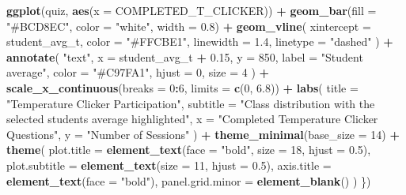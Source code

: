 \documentclass[
]{article}
\newenvironment{Shaded}{\begin{snugshade}}{\end{snugshade}}
\newcommand{\AttributeTok}[1]{\textcolor[rgb]{0.13,0.29,0.53}{#1}}
\newcommand{\DecValTok}[1]{\textcolor[rgb]{0.00,0.00,0.81}{#1}}
\newcommand{\FloatTok}[1]{\textcolor[rgb]{0.00,0.00,0.81}{#1}}
\newcommand{\FunctionTok}[1]{\textcolor[rgb]{0.13,0.29,0.53}{\textbf{#1}}}
\newcommand{\NormalTok}[1]{#1}
\newcommand{\SpecialCharTok}[1]{\textcolor[rgb]{0.81,0.36,0.00}{\textbf{#1}}}
\newcommand{\StringTok}[1]{\textcolor[rgb]{0.31,0.60,0.02}{#1}}
\begin{document}
\begin{Shaded}
\begin{Highlighting}[]
    \FunctionTok{ggplot}\NormalTok{(quiz, }\FunctionTok{aes}\NormalTok{(}\AttributeTok{x =}\NormalTok{ COMPLETED\_T\_CLICKER)) }\SpecialCharTok{+}
      \FunctionTok{geom\_bar}\NormalTok{(}\AttributeTok{fill =} \StringTok{"\#BCD8EC"}\NormalTok{, }\AttributeTok{color =} \StringTok{"white"}\NormalTok{, }\AttributeTok{width =} \FloatTok{0.8}\NormalTok{) }\SpecialCharTok{+}
      \FunctionTok{geom\_vline}\NormalTok{(}
        \AttributeTok{xintercept =}\NormalTok{ student\_avg\_t,}
        \AttributeTok{color =} \StringTok{"\#FFCBE1"}\NormalTok{,}
        \AttributeTok{linewidth =} \FloatTok{1.4}\NormalTok{,}
        \AttributeTok{linetype =} \StringTok{"dashed"}
\NormalTok{        ) }\SpecialCharTok{+}
      \FunctionTok{annotate}\NormalTok{(}
        \StringTok{"text"}\NormalTok{,}
        \AttributeTok{x =}\NormalTok{ student\_avg\_t }\SpecialCharTok{+} \FloatTok{0.15}\NormalTok{,}
        \AttributeTok{y =} \DecValTok{850}\NormalTok{,}
        \AttributeTok{label =} \StringTok{"Student average"}\NormalTok{,}
        \AttributeTok{color =} \StringTok{"\#C97FA1"}\NormalTok{,}
        \AttributeTok{hjust =} \DecValTok{0}\NormalTok{,}
        \AttributeTok{size =} \DecValTok{4}
\NormalTok{        ) }\SpecialCharTok{+}
      \FunctionTok{scale\_x\_continuous}\NormalTok{(}\AttributeTok{breaks =} \DecValTok{0}\SpecialCharTok{:}\DecValTok{6}\NormalTok{, }\AttributeTok{limits =} \FunctionTok{c}\NormalTok{(}\DecValTok{0}\NormalTok{, }\FloatTok{6.8}\NormalTok{)) }\SpecialCharTok{+}
      \FunctionTok{labs}\NormalTok{(}
        \AttributeTok{title =} \StringTok{"Temperature Clicker Participation"}\NormalTok{,}
        \AttributeTok{subtitle =} \StringTok{"Class distribution with the selected student\textquotesingle{}s average highlighted"}\NormalTok{,}
        \AttributeTok{x =} \StringTok{"Completed Temperature Clicker Questions"}\NormalTok{,}
        \AttributeTok{y =} \StringTok{"Number of Sessions"}
\NormalTok{        ) }\SpecialCharTok{+}
      \FunctionTok{theme\_minimal}\NormalTok{(}\AttributeTok{base\_size =} \DecValTok{14}\NormalTok{) }\SpecialCharTok{+}
      \FunctionTok{theme}\NormalTok{(}
        \AttributeTok{plot.title =} \FunctionTok{element\_text}\NormalTok{(}\AttributeTok{face =} \StringTok{"bold"}\NormalTok{, }\AttributeTok{size =} \DecValTok{18}\NormalTok{, }\AttributeTok{hjust =} \FloatTok{0.5}\NormalTok{),}
        \AttributeTok{plot.subtitle =} \FunctionTok{element\_text}\NormalTok{(}\AttributeTok{size =} \DecValTok{11}\NormalTok{, }\AttributeTok{hjust =} \FloatTok{0.5}\NormalTok{),}
        \AttributeTok{axis.title =} \FunctionTok{element\_text}\NormalTok{(}\AttributeTok{face =} \StringTok{"bold"}\NormalTok{),}
        \AttributeTok{panel.grid.minor =} \FunctionTok{element\_blank}\NormalTok{()}
\NormalTok{        )}
\NormalTok{    \})}
    

\end{Highlighting}
\end{Shaded}
\end{document}
